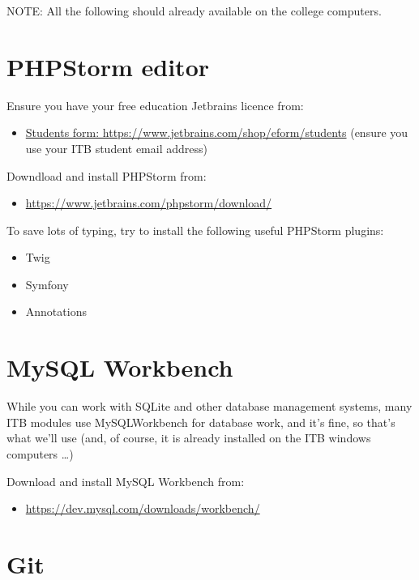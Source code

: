 \documentclass[a4paperpaper,openright]{book}
\providecommand{\tightlist}{%
  \setlength{\itemsep}{0pt}\setlength{\parskip}{0pt}}
\begin{document}
NOTE: All the following should already available on the college
computers.

\hypertarget{phpstorm-editor}{%
\section{PHPStorm editor}\label{phpstorm-editor}}

Ensure you have your free education Jetbrains licence from:

\begin{itemize}
\tightlist
\item
  \href{https://www.jetbrains.com/shop/eform/students}{Students form:
  https://www.jetbrains.com/shop/eform/students} (ensure you use your
  ITB student email address)
\end{itemize}

Downdload and install PHPStorm from:

\begin{itemize}
\tightlist
\item
  \url{https://www.jetbrains.com/phpstorm/download/}
\end{itemize}

To save lots of typing, try to install the following useful PHPStorm
plugins:

\begin{itemize}
\tightlist
\item
  Twig
\item
  Symfony
\item
  Annotations
\end{itemize}

\hypertarget{mysql-workbench}{%
\section{MySQL Workbench}\label{mysql-workbench}}

While you can work with SQLite and other database management systems,
many ITB modules use MySQLWorkbench for database work, and it's fine, so
that's what we'll use (and, of course, it is already installed on the
ITB windows computers \ldots{})

Download and install MySQL Workbench from:

\begin{itemize}
\tightlist
\item
  \url{https://dev.mysql.com/downloads/workbench/}
\end{itemize}

\hypertarget{git}{%
\section{Git}\label{git}}
\end{document}
